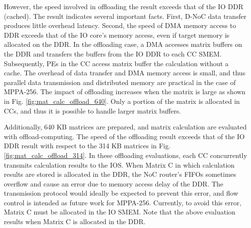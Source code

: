   However, the speed involved in offloading the result exceeds that of the IO DDR (cached).
  The result indicates several important facts.
  First, D-NoC data transfer produces little overhead latency.
  Second, the speed of DMA memory access to DDR exceeds that of the IO core's memory access, even if target memory is allocated on the DDR.
  In the offloading case, a DMA accesses matrix buffers on the DDR and transfers the buffers from the IO DDR to each CC SMEM.
  Subsequently, PEs in the CC access matrix buffer the calculation without a cache.
  The overhead of data transfer and DMA memory access is small, and thus parallel data transmission and distributed memory are practical in the case of MPPA-256.
  The impact of offloading increases when the matrix is large as shown in Fig. \ref{fig:mat_calc_offload_640}.
  Only a portion of the matrix is allocated in CCs, and thus it is possible to handle larger matrix buffers.
  
  Additionally, 640 KB matrices are prepared, and matrix calculation are evaluated with offload-computing.
  The speed of the offloading result exceeds that of the IO DDR result with respect to the 314 KB matrices in Fig. \ref{fig:mat_calc_offload_314}.
  In these offloading evaluations, each CC concurrently transmits calculation results to the IOS.
  When Matrix C in which calculation results are stored is allocated in the DDR, the NoC router's FIFOs sometimes overflow and cause an error due to memory access delay of the DDR.
  The transmission protocol would ideally be expected to prevent this error, and flow control is intended as future work for MPPA-256.
  Currently, to avoid this error, Matrix C must be allocated in the IO SMEM.
  Note that the above evaluation results when Matrix C is allocated in the DDR.
  
